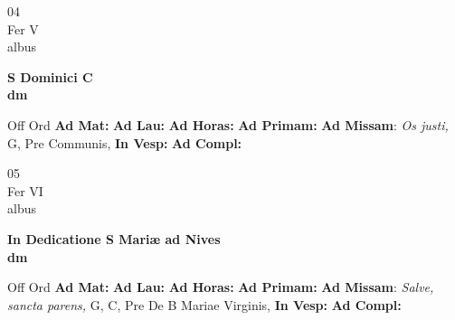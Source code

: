 \documentclass[10pt, openany]{book}
\begin{document}
    \begin{center}
        \begin{minipage}{3.5in}
            \vspace{2em}
            \begin{minipage}{0.5in}
                {\Huge 04} \\
                {\normalsize Fer V} \\
                {\normalsize albus}
            \end{minipage}
            \begin{minipage}{3.0in}
                \textbf{ \large S Dominici C \\
                \textnormal{\normalsize dm}} \\ 
            \end{minipage}
            \begin{justify}Off Ord
                \textbf{Ad Mat: }
                \textbf{Ad Lau: }
                \textbf{Ad Horas: }
                \textbf{Ad Primam: }\textbf{Ad Missam}: \textit{Os justi,} G, Pre Communis,  
                \textbf{In Vesp: }
                \textbf{Ad Compl: }
            \end{justify}
        \end{minipage}
    \end{center}

    \begin{center}
        \begin{minipage}{3.5in}
            \vspace{2em}
            \begin{minipage}{0.5in}
                {\Huge 05} \\
                {\normalsize Fer VI} \\
                {\normalsize albus}
            \end{minipage}
            \begin{minipage}{3.0in}
                \textbf{ \large In Dedicatione S Mariæ ad Nives \\
                \textnormal{\normalsize dm}} \\ 
            \end{minipage}
            \begin{justify}Off Ord
                \textbf{Ad Mat: }
                \textbf{Ad Lau: }
                \textbf{Ad Horas: }
                \textbf{Ad Primam: }\textbf{Ad Missam}: \textit{Salve, sancta parens,} G, C, Pre De B Mariae Virginis,  
                \textbf{In Vesp: }
                \textbf{Ad Compl: }
            \end{justify}
        \end{minipage}
    \end{center}
\end{document}
